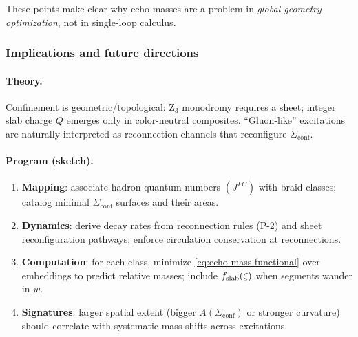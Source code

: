 These points make clear why echo masses are a problem in \emph{global geometry optimization}, not in single-loop calculus.

\subsubsection{Implications and future directions}
\label{sec:echo:future}

\paragraph{Theory.} Confinement is geometric/topological: Z$_3$ monodromy requires a sheet; integer slab charge $Q$ emerges only in color-neutral composites. ``Gluon-like'' excitations are naturally interpreted as reconnection channels that reconfigure $\Sigma_{\mathrm{conf}}$.

\paragraph{Program (sketch).}
\begin{enumerate}
\item \textbf{Mapping}: associate hadron quantum numbers $(J^{PC})$ with braid classes; catalog minimal $\Sigma_{\mathrm{conf}}$ surfaces and their areas.
\item \textbf{Dynamics}: derive decay rates from reconnection rules (P-2) and sheet reconfiguration pathways; enforce circulation conservation at reconnections.
\item \textbf{Computation}: for each class, minimize \eqref{eq:echo-mass-functional} over embeddings to predict relative masses; include $f_{\rm slab}(\zeta)$ when segments wander in $w$.
\item \textbf{Signatures}: larger spatial extent (bigger $A(\Sigma_{\mathrm{conf}})$ or stronger curvature) should correlate with systematic mass shifts across excitations.
\end{enumerate}


